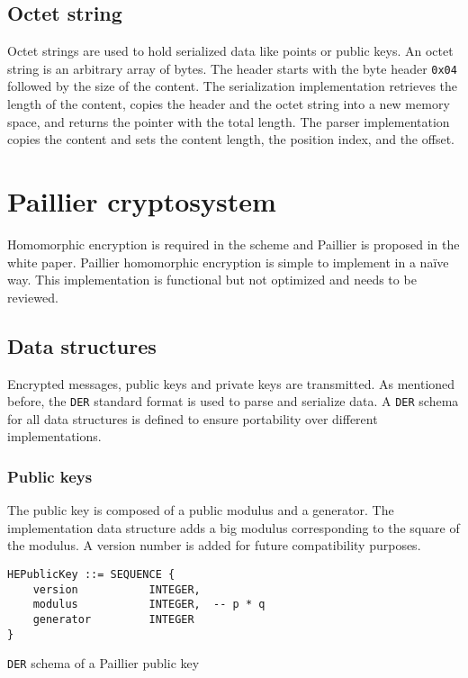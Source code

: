 \subsection{Octet string}

Octet strings are used to hold serialized data like points or public keys. An
octet string is an arbitrary array of bytes. The header starts with the byte header
\texttt{0x04} followed by the size of the content. The serialization
implementation retrieves the length of the content, copies the header and the
octet string into a new memory space, and returns the pointer with the total
length. The parser implementation copies the content and sets the content length,
the position index, and the offset.

\section{Paillier cryptosystem}

Homomorphic encryption is required in the scheme and Paillier is proposed in the
white paper. Paillier homomorphic encryption is simple to implement in a
naïve way. This implementation is functional but not optimized and needs to
be reviewed.

\subsection{Data structures}

Encrypted messages, public keys and private keys are transmitted. As mentioned before,
the \texttt{DER} standard format is used to parse and serialize data. A
\texttt{DER} schema for all data structures is defined to ensure portability
over different implementations.

\subsubsection{Public keys}

The public key is composed of a public modulus and a generator. The
implementation data structure adds a big modulus corresponding to the square of
the modulus. A version number is added for future compatibility purposes.

\begin{listing}
  \begin{verbatim}
HEPublicKey ::= SEQUENCE {
    version           INTEGER,
    modulus           INTEGER,  -- p * q
    generator         INTEGER
}
  \end{verbatim}
	\caption{\texttt{DER} schema of a Paillier public key}
	\label{lst:DERSchemaPaillierPub}
\end{listing}

